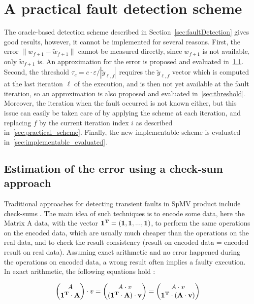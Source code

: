 \section{A practical fault detection scheme}
The oracle-based detection scheme described in Section~\ref{sec:faultDetection} gives good results, however, it cannot be implemented for several reasons. First, the error $\|{w}_{f+1} - \widetilde{w}_{f+1}\|$ cannot be measured directly, since $w_{f+1}$ is not available, only $\widetilde{w}_{f+1}$ is. An approximation for the error is proposed and evaluated in~\ref{sec:checksum}. Second, the threshold $\tau_c = c \cdot \varepsilon / |\widetilde{y}_{\ell, f}|$ requires the $\widetilde{y}_{\ell, f}$ vector which is computed at the last iteration $\ell$ of the execution, and is then not yet available at the fault iteration, so an approximation is also proposed and evaluated in~\ref{sec:threshold}. Moreover, the iteration when the fault occurred is not known either, but this issue can easily be taken care of by applying the scheme at each iteration, and replacing $f$ by the current iteration index $i$ as described in~\ref{sec:practical_scheme}. Finally, the new implementable scheme is evaluated in~\ref{sec:implementable_evaluated}.

\subsection{Estimation of the error using a check-sum approach}\label{sec:checksum}
Traditional approaches for detecting transient faults in SpMV product include check-sums \cite{checksum}. The main idea of such techniques is to encode some data, here the Matrix A data, with the vector $\bf{1}^T = (1, 1,..., 1)$, to perform the same operations on the encoded data, which are usually much cheaper than the operations on the real data, and to check the result consistency (result on encoded data = encoded result on real data). Assuming exact arithmetic and no error happened during the operations on encoded data, a wrong result often implies a faulty execution. 
In exact arithmetic, the following equations hold :


\begin{equation}
%
    \begin{pmatrix}
        A  \\
        \allOne^T \cdot A 
     \end{pmatrix} \cdot
	v
    =  \begin{pmatrix}
        A \cdot v \\
        (\allOne^T \cdot A) \cdot v
     \end{pmatrix} 
    =  \begin{pmatrix}
        A \cdot v \\
        \allOne^T \cdot (A \cdot v)
     \end{pmatrix} 
%
\end{equation}

